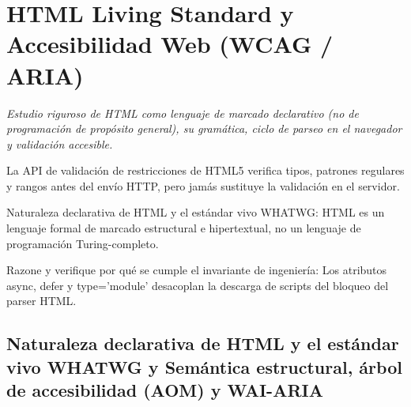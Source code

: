 \documentclass{book}
\begin{document}
\chapter{HTML Living Standard y Accesibilidad Web (WCAG / ARIA)}
\label{chap:ch-01}

\noindent\textit{Estudio riguroso de HTML como lenguaje de marcado declarativo (no de programación de propósito general), su gramática, ciclo de parseo en el navegador y validación accesible.}

\begin{tcolorbox}[title={Consejo}, studiumtip, breakable]

La API de validación de restricciones de HTML5 verifica tipos, patrones regulares y rangos antes del envío HTTP, pero jamás sustituye la validación en el servidor.
\end{tcolorbox}

\begin{tcolorbox}[title={Definición}, studiumdef, breakable]

Naturaleza declarativa de HTML y el estándar vivo WHATWG: HTML es un lenguaje formal de marcado estructural e hipertextual, no un lenguaje de programación Turing-completo.
\end{tcolorbox}

\begin{tcolorbox}[title={Autoficha}, studiumcheck, breakable]

Razone y verifique por qué se cumple el invariante de ingeniería: Los atributos async, defer y type='module' desacoplan la descarga de scripts del bloqueo del parser HTML.
\end{tcolorbox}

\section{Naturaleza declarativa de HTML y el estándar vivo WHATWG y Semántica estructural, árbol de accesibilidad (AOM) y WAI-ARIA}
\end{document}
